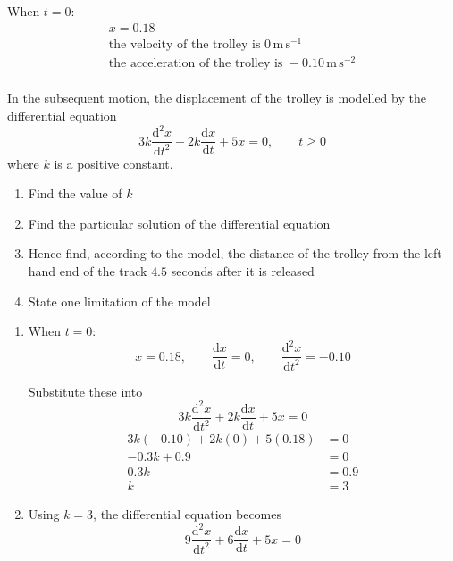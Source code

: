 \documentclass[leqno]{article}
\begin{document}
\begin{enumerate}[
  label=\textbf{\arabic*.},
  leftmargin=*,
  topsep=0pt,
  partopsep=0pt,
  parsep=0pt
]
When $t=0$:
\[
\renewcommand{\arraystretch}{1.2}
\begin{array}{l}
x=0.18\\
\text{the velocity of the trolley is }0\,\mathrm{m\,s^{-1}}\\
\text{the acceleration of the trolley is }-0.10\,\mathrm{m\,s^{-2}}
\end{array}
\] \\
In the subsequent motion, the displacement of the trolley is modelled by the differential equation
\[
3k\frac{\mathrm{d}^2 x}{\mathrm{d} t^2}+2k\frac{\mathrm{d} x}{\mathrm{d} t}+5x=0,\qquad t\ge 0
\]
where $k$ is a positive constant. \\

\begin{enumerate}[label=\textbf{(\alph*)}]
  \item Find the value of $k$  \\
  \item Find the particular solution of the differential equation  \\
  \item Hence find, according to the model, the distance of the trolley from the left-hand end of the track $4.5$ seconds after it is released  \\
  \item State one limitation of the model  \\
\end{enumerate}

\vspace*{10pt}

\begin{djsSolution}
\begin{enumerate}[label=\textbf{(\alph*)}]
  \item When $t=0$:
\[
x=0.18,\qquad \frac{\mathrm{d}x}{\mathrm{d}t}=0,\qquad \frac{\mathrm{d}^2x}{\mathrm{d}t^2}=-0.10
\]

Substitute these into
\[
3k\frac{\mathrm{d}^2x}{\mathrm{d}t^2}+2k\frac{\mathrm{d}x}{\mathrm{d}t}+5x=0
\]
\begin{align*}
3k(-0.10)+2k(0)+5(0.18)&=0\\
-0.3k+0.9&=0\\
0.3k&=0.9\\
k&=3
\end{align*}

  \item Using $k=3$, the differential equation becomes
\[
9\frac{\mathrm{d}^2x}{\mathrm{d}t^2}+6\frac{\mathrm{d}x}{\mathrm{d}t}+5x=0
\]


\end{enumerate}
\end{djsSolution}
\end{enumerate}
\end{document}
